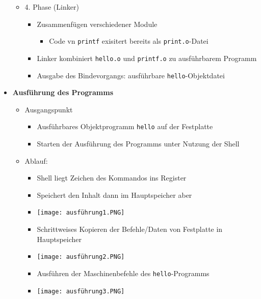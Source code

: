 \begin{itemize}
\begin{itemize}
                \item 4. Phase (Linker)
                    \begin{itemize}
                        \item Zusammenfügen verschiedener Module
                            \begin{itemize}
                                \item Code vn \texttt{printf} exisitert bereits als \texttt{print.o}-Datei
                            \end{itemize}
                        \item Linker kombiniert \texttt{hello.o} und \texttt{printf.o} zu ausführbarem Programm
                        \item Ausgabe des Bindevorgangs: ausführbare \texttt{hello}-Objektdatei
                    \end{itemize}
            
            \end{itemize}
        
        \item \textbf{Ausführung des Programms}
            \begin{itemize}
                \item Ausgangspunkt
                    \begin{itemize}
                        \item Ausführbares Objektprogramm \texttt{hello} auf der Festplatte 
                        \item Starten der Ausführung des Programms unter Nutzung der Shell 
                    \end{itemize}
                
                \item Ablauf:
                    \begin{itemize}
                        \item Shell liegt Zeichen des Kommandos ins Register
                        \item Speichert den Inhalt dann im Hauptspeicher aber
                        \item[] \texttt{[image: ausführung1.PNG]}
                        \item Schrittweises Kopieren der Befehle/Daten von Festplatte in Hauptspeicher
                        \item[] \texttt{[image: ausführung2.PNG]}
                        \item Ausführen der Maschinenbefehle des \texttt{hello}-Programms
                        \item[] \texttt{[image: ausführung3.PNG]} 
                    \end{itemize}
            \end{itemize}


\end{itemize}
